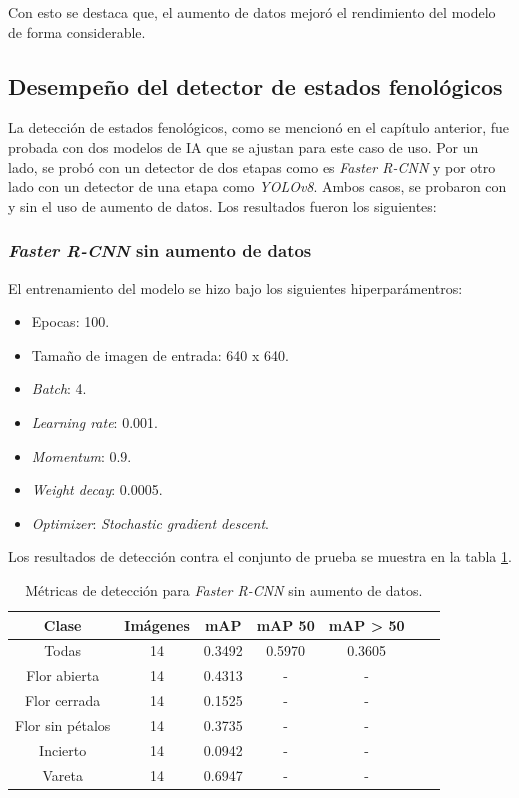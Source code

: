 Con esto se destaca que, el aumento de datos mejoró el rendimiento del modelo de forma considerable.

\subsection{Desempeño del detector de estados fenológicos}

La detección de estados fenológicos, como se mencionó en el capítulo anterior, fue probada con dos modelos de IA que se ajustan para este caso de uso. Por un lado, se probó con un detector de dos etapas como es \textit{Faster R-CNN} y por otro lado con un detector de una etapa como \textit{YOLOv8}. Ambos casos, se probaron con y sin el uso de aumento de datos. Los resultados fueron los siguientes:

\subsubsection{\textit{Faster R-CNN} sin aumento de datos}

El entrenamiento del modelo se hizo bajo los siguientes hiperparámentros:

\begin{itemize}
	\item Epocas: 100.
    \item Tamaño de imagen de entrada: 640 x 640.
    \item \textit{Batch}: 4.
    \item \textit{Learning rate}: 0.001.
    \item \textit{Momentum}: 0.9.
    \item \textit{Weight decay}: 0.0005.
    \item \textit{Optimizer}: \textit{Stochastic gradient descent}.
\end{itemize}

Los resultados de detección contra el conjunto de prueba se muestra en la tabla \ref{tab:resultadosFasterSinAug}.

\begin{table}[h]
	\centering
	\caption{Métricas de detección para \textit{Faster R-CNN} sin aumento de datos.}
	\begin{tabular}{c c c c c c c}    
		\toprule
		\textbf{Clase}&\textbf{Imágenes}&\textbf{mAP}&\textbf{mAP 50}&\textbf{mAP > 50}\\
		\midrule
		Todas & 14 & 0.3492 & 0.5970 & 0.3605\\
		Flor abierta & 14 & 0.4313 & - & - \\
		Flor cerrada & 14 & 0.1525 & - & - \\
		Flor sin pétalos & 14 & 0.3735 & - & - \\
		Incierto & 14 & 0.0942 & - & - \\
		Vareta & 14 & 0.6947 & - & - \\		
		\bottomrule
		\hline
	\end{tabular}
	\label{tab:resultadosFasterSinAug}
\end{table}

